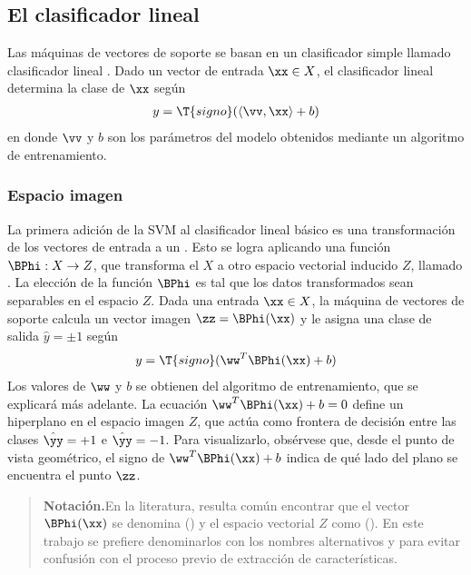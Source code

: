 %
%
\subsection{El clasificador lineal}
%
Las máquinas de vectores de soporte se basan en un clasificador simple
llamado clasificador lineal \cite{nilsson}.
Dado un vector de entrada $\xx\in{}X$, el clasificador lineal
determina la clase de $\xx$ según
%
\begin{align*}
  y = \T{signo}(\langle\vv,\xx\rangle+b)
\end{align*}
%
en donde $\vv$ y $b$ son los parámetros del modelo obtenidos mediante
un algoritmo de entrenamiento.
%
\subsubsection{Espacio imagen}
%
La primera adición de la SVM al clasificador lineal básico es una
transformación de los vectores de entrada a un .
Esto se logra aplicando una función $\BPhi:X\rightarrow{}Z$, que
transforma el  $X$ a otro espacio vectorial
inducido $Z$, llamado .
La elección de la función $\BPhi$ es tal que los datos transformados
sean separables en el espacio $Z$.
Dada una entrada $\xx\in{}X$, la máquina de vectores de soporte
calcula un vector imagen $\zz=\BPhi(\xx)$ y le asigna una clase de
salida $\hat{y}=\pm{}1$ según
%
\begin{align*}
  y = \T{signo}(\ww^T \BPhi(\xx)+b)
\end{align*}
%
Los valores de $\ww$ y $b$ se obtienen del algoritmo de entrenamiento,
que se explicará más adelante.
La ecuación $\ww^T\BPhi(\xx)+b=0$ define un hiperplano en el espacio
imagen $Z$, que actúa como frontera de decisión entre las clases
$\hat{\yy}=+1$ e $\hat{\yy}=-1$.
Para visualizarlo, obsérvese que, desde el punto de vista geométrico,
el signo de $\ww^T\BPhi(\xx)+b$ indica de qué lado del plano se
encuentra el punto $\zz$.
%
\begin{quote}
  {\bfseries Notación.}\quad{}En la literatura, resulta común
  encontrar que el vector $\BPhi(\xx)$ se denomina  () y el espacio vectorial $Z$
  como  ().  En
  este trabajo se prefiere denominarlos con los nombres alternativos
   y  para evitar
  confusión con el proceso previo de extracción de características.
\end{quote}
%
